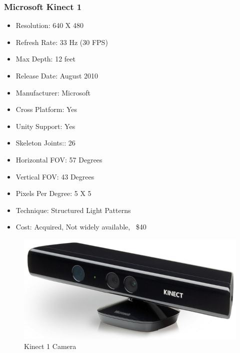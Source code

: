 \documentclass[a4paper,10pt]{article}
\begin{document}
\subsubsection{Microsoft Kinect 1}
\begin{itemize}
  \item Resolution: 640 X 480
  \item Refresh Rate: 33 Hz (30 FPS)
  \item Max Depth: 12 feet
  \item Release Date: August 2010 
  \item Manufacturer: Microsoft
  \item Cross Platform: Yes
  \item Unity Support: Yes
  \item Skeleton Joints:: 26
  \item Horizontal FOV: 57 Degrees
  \item Vertical FOV: 43 Degrees
  \item Pixels Per Degree: 5 X 5
  \item Technique: Structured Light Patterns
  \item Cost: Acquired, Not widely available, ~\$40
\end{itemize}
\begin{figure}[H]
	\includegraphics[width=\linewidth,height=\paperheight,keepaspectratio]{kinect1.jpg}
	\caption{Kinect 1 Camera}
	\label{fig:k1Cam}
	\end{figure}
	\pagebreak
\end{document}
